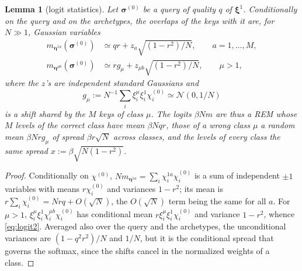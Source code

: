 \documentclass{SciPost}
\theoremstyle{plain}
\newtheorem{lemma}{Lemma}
\theoremstyle{definition}
\newcommand{\s}{\bm{\sigma}}
\newcommand{\x}{\bm{\xi}}
\newcommand{\e}{\bm{\eta}}
\begin{document}
\begin{lemma}[logit statistics]\label{lem:logits}
Let $\s^{(0)}$ be a query of quality $q$ of $\x^1$. Conditionally on the query and on the archetypes, the overlaps of the keys with it are, for $N\gg1$, Gaussian variables
\begin{align}
m_{\e^{1a}}(\s^{(0)})&\simeq qr+z_a\sqrt{(1-r^2)/N},\qquad a=1,\dots,M,\label{eq:logit1}\\
m_{\e^{\mu b}}(\s^{(0)})&\simeq rg_\mu+z_{\mu b}\sqrt{(1-r^2)/N},\qquad \mu>1,\label{eq:logit2}
\end{align}
where the $z$'s are independent standard Gaussians and
\begin{equation*}
g_\mu:=N^{-1}\sum_i\xi^\mu_i\xi^1_i\chi^{(0)}_i\simeq\mathcal N(0,1/N)
\end{equation*}
is a shift shared by the $M$ keys of class $\mu$. The logits $\beta Nm$ are thus a REM whose $M$ levels of the correct class have mean $\beta Nqr$, those of a wrong class $\mu$ a random mean $\beta Nrg_\mu$ of spread $\beta r\sqrt N$ across classes, and the levels of every class the same spread $x:=\beta\sqrt{N(1-r^2)}$.
\end{lemma}
\begin{proof}
Conditionally on $\chi^{(0)}$, $Nm_{\e^{1a}}=\sum_i\chi^{1a}_i\chi^{(0)}_i$ is a sum of independent $\pm1$ variables with means $r\chi^{(0)}_i$ and variances $1-r^2$; its mean is $r\sum_i\chi^{(0)}_i=Nrq+O(\sqrt N)$, the $O(\sqrt N)$ term being the same for all $a$. For $\mu>1$, $\xi^\mu_i\xi^1_i\chi^{\mu b}_i\chi^{(0)}_i$ has conditional mean $r\xi^\mu_i\xi^1_i\chi^{(0)}_i$ and variance $1-r^2$, whence \eqref{eq:logit2}. Averaged also over the query and the archetypes, the unconditional variances are $(1-q^2r^2)/N$ and $1/N$, but it is the conditional spread that governs the softmax, since the shifts cancel in the normalized weights of a class.
\end{proof}
\end{document}
